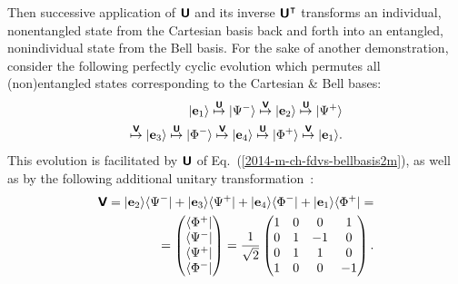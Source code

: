 \documentclass[%
  twocolumn,
 showpacs,
 showkeys,
 preprintnumbers,
 amsmath,amssymb,
 aps,
  pra,
  longbibliography,
 floatfix,
 ]{revtex4-1}
\begin{document}
Then successive application of  $\textsf{\textbf{U}}$ and its inverse $\textsf{\textbf{U}}^\intercal$ transforms an individual,
nonentangled state from the Cartesian basis back and forth
into an entangled, nonindividual state from the Bell basis.
For the sake of another demonstration,
consider the following perfectly cyclic evolution  which permutes all (non)entangled  states
corresponding to the Cartesian \&  Bell bases:
\begin{equation}
\begin{split}
\vert {\bf e}_1 \rangle
\stackrel{\textsf{\textbf{U}}}{\mapsto}
\vert \Psi^- \rangle
\stackrel{\textsf{\textbf{V}}}{\mapsto}
\vert {\bf e}_2 \rangle
\stackrel{\textsf{\textbf{U}}}{\mapsto}
\vert \Psi^+ \rangle   \\
\stackrel{\textsf{\textbf{V}}}{\mapsto}
\vert {\bf e}_3 \rangle
\stackrel{\textsf{\textbf{U}}}{\mapsto}
\vert \Phi^- \rangle
\stackrel{\textsf{\textbf{V}}}{\mapsto}
\vert {\bf e}_4 \rangle
\stackrel{\textsf{\textbf{U}}}{\mapsto}
\vert \Phi^+ \rangle
\stackrel{\textsf{\textbf{V}}}{\mapsto}
\vert {\bf e}_1 \rangle
.
\end{split}
\label{2017-m-pu-book-chapter-qm-baf}
\end{equation}
This evolution is facilitated by $\textsf{\textbf{U}}$
of Eq.~(\ref{2014-m-ch-fdvs-bellbasis2m}), as well as by the following additional unitary transformation~\cite{Schwinger.60}:
\begin{equation}
 \begin{split}
\textsf{\textbf{V}} =
\vert {\bf e}_2 \rangle \langle  \Psi^-  \vert  +
\vert {\bf e}_3 \rangle \langle  \Psi^+  \vert  +
\vert {\bf e}_4 \rangle \langle  \Phi^-  \vert  +
\vert {\bf e}_1 \rangle \langle  \Phi^+  \vert
=
\\
=
\begin{pmatrix}
 \langle \Phi^+ \vert \\
 \langle \Psi^- \vert \\
 \langle \Psi^+ \vert \\
 \langle \Phi^- \vert  \end{pmatrix}
=   \frac{1}{\sqrt{2}}
\begin{pmatrix}
1 & 0 &   0 &   1 \\
0 & 1 &   -1 &   0 \\
0& 1 &   1 &   0 \\
1 & 0 &  0 &  -1
 \end{pmatrix}
.
\end{split}
\label{2017-m-pu-book-chapter-qm-baf-uo}
\end{equation}
\end{document}
